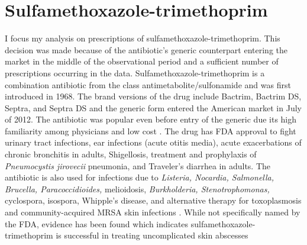 \section{Sulfamethoxazole-trimethoprim}
\indent I focus my analysis on prescriptions of sulfamethoxazole-trimethoprim. This decision was made because of the antibiotic's generic counterpart entering the market in the middle of the observational period and a sufficient number of prescriptions occurring in the data. Sulfamethoxazole-trimethoprim is a combination antibiotic from the class antimetabolite/sulfonamide and was first introduced in 1968. The brand versions of the drug include Bactrim, Bactrim DS, Septra, and Septra DS and the generic form entered the American market in July of 2012. The antibiotic was popular even before entry of the generic due its high familiarity among physicians and low cost \cite{noauthor_sulfamethoxazole_nodate,ho_considerations_2011}. The drug has FDA approval to fight urinary tract infections, ear infections (acute otitis media), acute exacerbations of chronic bronchitis in adults, Shigellosis, treatment and prophylaxis of \textit{Pneumocystis jirovecii} pneumonia, and Traveler's diarrhea in adults. The antibiotic is also used for infections due to \textit{Listeria, Nocardia, Salmonella, Brucella, Paracoccidioides,} melioidosis, \textit{Burkholderia, Stenotrophomonas,} cyclospora, isospora, Whipple's disease, and alternative therapy for toxoplasmosis and community-acquired MRSA skin infections \cite{schlossberg_antibiotics_2017}. While not specifically named by the FDA, evidence has been found which indicates sulfamethoxazole-trimethoprim is successful in treating uncomplicated skin abscesses \cite{noauthor_trimethoprimsulfamethoxazole_nodate}\\
